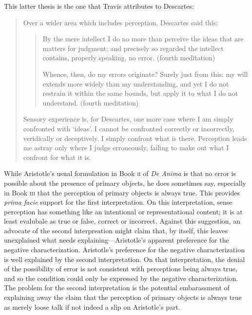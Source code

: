 This latter thesis is the one that Travis attributes to Descartes:
\begin{quotation}
	\noindent Over a wider area which includes perception, Descartes said this:
	\begin{quote}
		By the mere intellect I do no more than perceive the ideas that are matters for judgment; and precisely so regarded the intellect contains, properly speaking, no error. (fourth meditation)
		
		Whence, then, do my errors originate? Surely just from this: my will extends more widely than my understanding, and yet I do not restrain it within the same bounds, but apply it to what I do not understand. (fourth meditation)
	\end{quote}
	Sensory experience is, for Descartes, one more case where I am simply confronted with `ideas'. I cannot be confronted correctly or incorrectly, veridically or deceptively. I simply confront what is there. Perception leads me astray only where I judge erroneously, failing to make out what I confront for what it is. \citep[64--65]{Travis:2004kx}
\end{quotation}

While Aristotle's usual formulation in Book \textsc{ii} of \emph{De Anima} is that no error is possible about the presence of primary objects, he does sometimes say, especially in Book \textsc{iii} that the perception of primary objects is always true. This provides \emph{prima facie} support for the first interpretation. On this interpretation, sense perception has something like an intentional or representational content; it is at least evalubale as true or false, correct or incorrect. Against this suggestion, an advocate of the second interpreation might claim that, by itself, this leaves unexplained what needs explaining---\-Aristotle's apparent preference for the negative characterization. Aristotle's preference for the negative characterization is well explained by the second interpretation. On that interpretation, the denial of the possibility of error is not consistent with perceptions being always true, and so the condition could only be expressed by the negative characterization. The problem for the second interpretation is the potential embarassment of explaining away the claim that the perception of primary objects is always true as merely loose talk if not indeed a slip on Aristotle's part.

